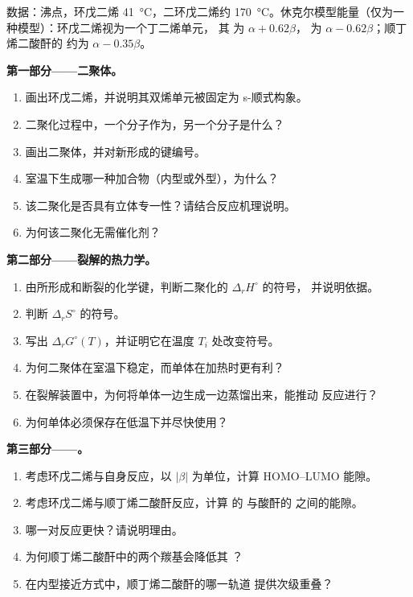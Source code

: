 \begin{problem}
\label{pb:b2:frontier-orbitals:1}
数据：沸点，环戊二烯 \qty{41}{\degreeCelsius}，二环戊二烯约
\qty{170}{\degreeCelsius}。休克尔模型能量（仅为一种模型）：环戊二烯视为一个丁二烯单元，
其  为 $\alpha + 0.62\beta$， 为 $\alpha - 0.62\beta$；顺丁烯二酸酐的 
约为 $\alpha - 0.35\beta$。

\medskip
\noindent\textbf{第一部分——二聚体。}
\begin{enumerate}
  \item 画出环戊二烯，并说明其双烯单元被固定为 s-顺式构象。
  \item 二聚化过程中，一个分子作为，另一个分子是什么？
  \item 画出二聚体，并对新形成的键编号。
  \item 室温下生成哪一种加合物（内型或外型），为什么？
  \item 该二聚化是否具有立体专一性？请结合反应机理说明。
  \item 为何该二聚化无需催化剂？
\end{enumerate}

\medskip
\noindent\textbf{第二部分——裂解的热力学。}
\begin{enumerate}[resume]
  \item 由所形成和断裂的化学键，判断二聚化的 $\Delta_r H^\circ$ 的符号，
        并说明依据。
  \item 判断 $\Delta_r S^\circ$ 的符号。
  \item 写出 $\Delta_r G^\circ(T)$，并证明它在温度 $T_i$ 处改变符号。
  \item 为何二聚体在室温下稳定，而单体在加热时更有利？
  \item 在裂解装置中，为何将单体一边生成一边蒸馏出来，能推动
        反应进行？
  \item 为何单体必须保存在低温下并尽快使用？
\end{enumerate}

\medskip
\noindent\textbf{第三部分——。}
\begin{enumerate}[resume]
  \item 考虑环戊二烯与自身反应，以
        $|\beta|$ 为单位，计算 HOMO--LUMO 能隙。
  \item 考虑环戊二烯与顺丁烯二酸酐反应，计算
        的  与酸酐的  之间的能隙。
  \item 哪一对反应更快？请说明理由。
  \item 为何顺丁烯二酸酐中的两个羰基会降低其 ？
  \item 在内型接近方式中，顺丁烯二酸酐的哪一轨道
        提供次级重叠？
\end{enumerate}


\end{problem}
